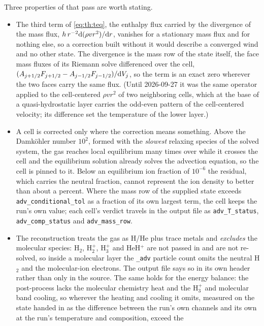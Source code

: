 Three properties of that pass are worth stating.

\begin{itemize}
\item The third term of \eqref{eq:th:teq}, the enthalpy flux carried by the
  divergence of the mass flux, $h\,r^{-2}{\rm d}(\rho v r^{2})/{\rm d}r$,
  vanishes for a stationary mass flux and for nothing else, so a correction
  built without it would describe a converged wind and no other state. The
  divergence is the mass row of the state itself, the face mass fluxes of
  its Riemann solve differenced over the cell,
  $(A_{j+1/2}F_{j+1/2}-A_{j-1/2}F_{j-1/2})/{\rm d}V_j$, so the term is an
  exact zero wherever the two faces carry the same flux. (Until 2026-09-27
  it was the same operator applied to the cell-centered $\rho v r^{2}$ of two
  neighboring cells, which at the base of a quasi-hydrostatic layer carries
  the odd-even pattern of the cell-centered velocity; its difference set the
  temperature of the lower layer.)
\item A cell is corrected only where the correction means something. Above
  the Damk\"ohler number $10^{2}$, formed with the \emph{slowest} relaxing
  species of the solved system, the gas reaches local equilibrium many times
  over while it crosses the cell and the equilibrium solution already solves
  the advection equation, so the cell is pinned to it. Below an equilibrium
  ion fraction of $10^{-6}$ the residual, which carries the neutral
  fraction, cannot represent the ion density to better than about a percent.
  Where the mass row of the supplied state exceeds
  \texttt{adv\_conditional\_tol} as a fraction of its own largest term, the
  cell keeps the run's own value; each cell's verdict travels in the output
  file as \texttt{adv\_T\_status}, \texttt{adv\_comp\_status} and
  \texttt{adv\_mass\_row}.
\item The reconstruction treats the gas as H/He plus trace metals and
  \emph{excludes} the molecular species: H$_2$, H$_2^+$, H$_3^+$ and
  HeH$^+$ are not passed in and are not re-solved, so inside a molecular
  layer the \texttt{\_adv} particle count omits the neutral H$_2$ and the
  molecular-ion electrons. The output file says so in its own header rather
  than only in the source.  The same holds for the energy balance: the
  post-process lacks the molecular chemistry heat and the H$_3^+$ and
  molecular band cooling, so wherever the heating and cooling it omits,
  measured on the state handed in as the difference between the run's own
  channels and its own at the run's temperature and composition, exceed the

\end{itemize}
